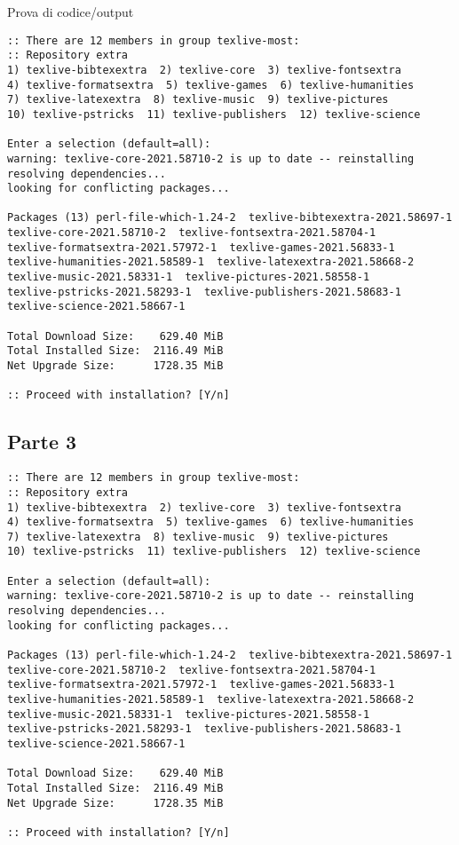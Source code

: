 Prova di codice/output

\begin{lstlisting}[style=cmd]
:: There are 12 members in group texlive-most:
:: Repository extra
1) texlive-bibtexextra  2) texlive-core  3) texlive-fontsextra
4) texlive-formatsextra  5) texlive-games  6) texlive-humanities
7) texlive-latexextra  8) texlive-music  9) texlive-pictures
10) texlive-pstricks  11) texlive-publishers  12) texlive-science

Enter a selection (default=all): 
warning: texlive-core-2021.58710-2 is up to date -- reinstalling
resolving dependencies...
looking for conflicting packages...

Packages (13) perl-file-which-1.24-2  texlive-bibtexextra-2021.58697-1
texlive-core-2021.58710-2  texlive-fontsextra-2021.58704-1
texlive-formatsextra-2021.57972-1  texlive-games-2021.56833-1
texlive-humanities-2021.58589-1  texlive-latexextra-2021.58668-2
texlive-music-2021.58331-1  texlive-pictures-2021.58558-1
texlive-pstricks-2021.58293-1  texlive-publishers-2021.58683-1
texlive-science-2021.58667-1

Total Download Size:    629.40 MiB
Total Installed Size:  2116.49 MiB
Net Upgrade Size:      1728.35 MiB

:: Proceed with installation? [Y/n] 

\end{lstlisting}

\subsection{Parte 3}

\begin{lstlisting}[style=output]
:: There are 12 members in group texlive-most:
:: Repository extra
1) texlive-bibtexextra  2) texlive-core  3) texlive-fontsextra
4) texlive-formatsextra  5) texlive-games  6) texlive-humanities
7) texlive-latexextra  8) texlive-music  9) texlive-pictures
10) texlive-pstricks  11) texlive-publishers  12) texlive-science

Enter a selection (default=all): 
warning: texlive-core-2021.58710-2 is up to date -- reinstalling
resolving dependencies...
looking for conflicting packages...

Packages (13) perl-file-which-1.24-2  texlive-bibtexextra-2021.58697-1
texlive-core-2021.58710-2  texlive-fontsextra-2021.58704-1
texlive-formatsextra-2021.57972-1  texlive-games-2021.56833-1
texlive-humanities-2021.58589-1  texlive-latexextra-2021.58668-2
texlive-music-2021.58331-1  texlive-pictures-2021.58558-1
texlive-pstricks-2021.58293-1  texlive-publishers-2021.58683-1
texlive-science-2021.58667-1

Total Download Size:    629.40 MiB
Total Installed Size:  2116.49 MiB
Net Upgrade Size:      1728.35 MiB

:: Proceed with installation? [Y/n] 
\end{lstlisting}